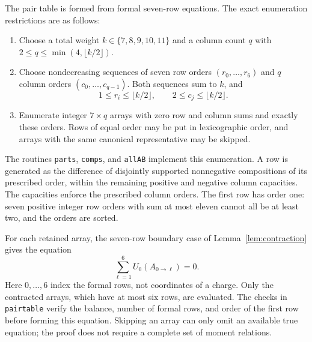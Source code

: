 The pair table is formed from formal seven-row equations.  The exact
enumeration restrictions are as follows:
\begin{enumerate}[label=(\roman*)]
 \item Choose a total weight $k\in\{7,8,9,10,11\}$ and a column count
 $q$ with $2\le q\le\min(4,\lfloor k/2\rfloor)$.
 \item Choose nondecreasing sequences of seven row orders
 $(r_0,\ldots,r_6)$ and $q$ column orders $(c_0,\ldots,c_{q-1})$.
 Both sequences sum to $k$, and
 \[
 1\le r_i\le\lfloor k/2\rfloor,
 \qquad 2\le c_j\le\lfloor k/2\rfloor.
 \]
 \item Enumerate integer $7\times q$ arrays with zero row and column
 sums and exactly these orders.  Rows of equal order may be put in
 lexicographic order, and arrays with the same canonical representative
 may be skipped.
\end{enumerate}
The routines \texttt{parts}, \texttt{comps}, and \texttt{allAB} implement
this enumeration.  A row is generated as the difference of disjointly
supported nonnegative compositions of its prescribed order, within the
remaining positive and negative column capacities.  The capacities
enforce the prescribed column orders.  The first row has order one:
seven positive integer row orders with sum at most eleven cannot all
be at least two, and the orders are sorted.

For each retained array, the seven-row boundary case of
Lemma~\ref{lem:contraction} gives the equation
\begin{equation}
 \sum_{\ell=1}^{6}U_0(A_{0\to\ell})=0.
 \label{eq:pair-table-equations}
\end{equation}
Here $0,\ldots,6$ index the formal rows, not coordinates of a charge.
Only the contracted arrays, which have at most six rows, are evaluated.
The checks in \texttt{pairtable} verify the balance, number of formal
rows, and order of the first row before forming this equation.
Skipping an array can only omit an available true equation; the proof
does not require a complete set of moment relations.

